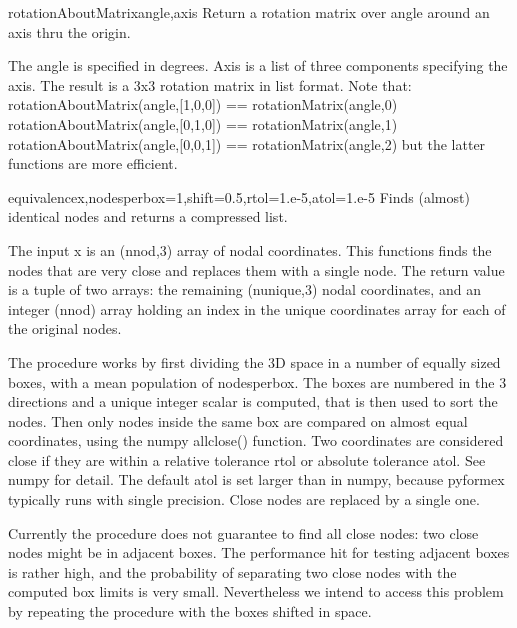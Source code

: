 {{\begin{funcdesc}{rotationAboutMatrix}{angle,axis}
    Return a rotation matrix over angle around an axis thru the origin.

    The angle is specified in degrees.
    Axis is a list of three components specifying the axis.
    The result is a 3x3 rotation matrix in list format.
    Note that:
      rotationAboutMatrix(angle,[1,0,0]) == rotationMatrix(angle,0) 
      rotationAboutMatrix(angle,[0,1,0]) == rotationMatrix(angle,1) 
      rotationAboutMatrix(angle,[0,0,1]) == rotationMatrix(angle,2)
    but the latter functions are more efficient.
\end{funcdesc}
    


\begin{funcdesc}{equivalence}{x,nodesperbox=1,shift=0.5,rtol=1.e-5,atol=1.e-5}
    Finds (almost) identical nodes and returns a compressed list.

    The input x is an (nnod,3) array of nodal coordinates. This functions finds
    the nodes that are very close and replaces them with a single node.
    The return value is a tuple of two arrays: the remaining (nunique,3) nodal
    coordinates, and an integer (nnod) array holding an index in the unique
    coordinates array for each of the original nodes.

    The procedure works by first dividing the 3D space in a number of
    equally sized boxes, with a mean population of nodesperbox.
    The boxes are numbered in the 3 directions and a unique integer scalar
    is computed, that is then used to sort the nodes.
    Then only nodes inside the same box are compared on almost equal
    coordinates, using the numpy allclose() function. Two coordinates are
    considered close if they are within a relative tolerance rtol or absolute
    tolerance atol. See numpy for detail. The default atol is set larger than
    in numpy, because pyformex typically runs with single precision.
    Close nodes are replaced by a single one.

    Currently the procedure does not guarantee to find all close nodes:
    two close nodes might be in adjacent boxes. The performance hit for
    testing adjacent boxes is rather high, and the probability of separating
    two close nodes with the computed box limits is very small. Nevertheless
    we intend to access this problem by repeating the procedure with the
    boxes shifted in space.
\end{funcdesc}
    


}}
